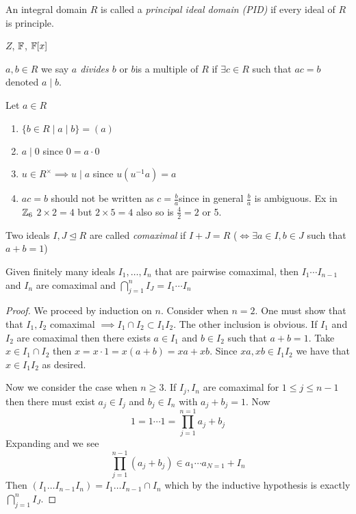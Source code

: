 \documentclass[master.tex]{subfiles}
\begin{document}
\begin{defn}
  An integral domain \(R\) is called a \emph{principal ideal domain (PID)} if every ideal of \(R\) is principle.
\end{defn}

\begin{examples}
  \(Z\), \(\mathbb{F}\), \(\mathbb{F}[x]\)
\end{examples}

\begin{notation}
  \(a,b \in R\) we say \emph{\(a\) divides \(b\)} or \(b\)is a multiple of \(R\) if \(\exists c \in R\) such that
  \(ac=b\) denoted \(a \mid b\).
\end{notation}

\begin{rmk} Let \(a \in R\)
  \begin{enumerate}[label=(\alph*)]
  \item \(\{b \in R \mid a \mid b\}=(a)\)
  \item \(a \mid 0\) since \(0=a \cdot 0 \)
  \item \(u \in R^\times \implies u \mid a\) since \(u(u^{-1}a)=a\)
  \item \(ac=b\) should not be written as \(c=\frac{b}{a}\)since in general \(\frac{b}{a}\) is ambiguous. Ex in \({\mathbb Z}_6\)
    \(2 \times 2 = 4\) but \(2 \times 5 = 4\) also so is \(\frac{4}{2}=2\) or 5.
  \end{enumerate}
\end{rmk}

\begin{defn}
  Two ideals \(I, J \unlhd R\) are called \emph{comaximal} if \(I+J=R\) (\(\iff \exists a \in I, b \in J\) such that
  \(a+b=1\))
\end{defn}

\begin{lem}
  Given finitely many ideals \(I_1,\ldots, I_n\) that are pairwise comaximal, then \(I_1 \cdots I_{n-1}\) and \(I_n\)
  are comaximal and \(\bigcap_{j=1}^n I_J = I_1 \cdots I_n\)
\end{lem}

\begin{proof}
  We proceed by induction on \(n\). Consider when \(n=2\). One must show that that \(I_1,I_2\) comaximal
  \(\implies I_1 \cap I_2 \subset I_1I_2\). The other inclusion is obvious. If \(I_1\) and \(I_2\) are comaximal then
  there exists \(a \in I_1\) and \(b \in I_2\) such that \(a+b=1\). Take \(x \in I_1 \cap I_2\) then \(x=x \cdot 1 =
  x(a+b)=xa+xb\). Since \(xa,xb \in I_1 I_2\) we have that \(x \in I_1 I_2\) as desired.

  Now we consider the case when \(n \ge 3\). If \(I_j,I_n\) are comaximal for \(1 \le j \le n-1\) then there must exist
  \(a_j \in I_j\) and \(b_j \in I_n\) with \(a_j+b_j = 1\). Now
  \[1=1 \cdots 1 = \prod_{j=1}^{n=1}{a_j + b_j}\]
  Expanding and we see 
  \[\prod_{j=1}^{n-1}(a_j+b_j) \in a_1 \cdots a_{N=1}+I_n\]
  Then \((I_1 \ldots I_{n-1}I_n)=I_1 \ldots I_{n-1} \cap I_n\)
  which by the inductive hypothesis is exactly \(\bigcap_{j=1}^n I_J\).
\end{proof}
\end{document}
